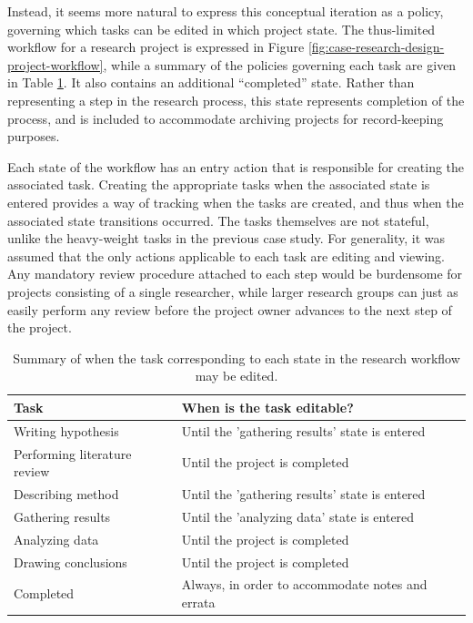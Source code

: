 \documentclass[document.tex]{subfiles}
\begin{document}
Instead, it seems more natural to express this conceptual iteration as a policy, governing which tasks can be edited in which project state. The thus-limited workflow for a research project is expressed in Figure \ref{fig:case-research-design-project-workflow}, while a summary of the policies governing each task are given in Table \ref{tbl:case-research-edit-policies}. It also contains an additional ``completed'' state. Rather than representing a step in the research process, this state represents completion of the process, and is included to accommodate archiving projects for record-keeping purposes.

Each state of the workflow has an entry action that is responsible for creating the associated task. Creating the appropriate tasks when the associated state is entered provides a way of tracking when the tasks are created, and thus when the associated state transitions occurred. The tasks themselves are not stateful, unlike the heavy-weight tasks in the previous case study. For generality, it was assumed that the only actions applicable to each task are editing and viewing. Any mandatory review procedure attached to each step would be burdensome for projects consisting of a single researcher, while larger research groups can just as easily perform any review before the project owner advances to the next step of the project.

\begin{table}
  \centering
  \caption{Summary of when the task corresponding to each state in the research workflow may be edited.}
  \label{tbl:case-research-edit-policies}
  \tablespacer
  \begin{tabular}{ l l }
    \toprule
    Task & When is the task editable? \\
    \midrule
    Writing hypothesis & Until the 'gathering results' state is entered \\
    Performing literature review & Until the project is completed \\
    Describing method & Until the 'gathering results' state is entered \\
    Gathering results & Until the 'analyzing data' state is entered \\
    Analyzing data & Until the project is completed \\
    Drawing conclusions & Until the project is completed \\
    Completed & Always, in order to accommodate notes and errata \\
    \bottomrule
  \end{tabular}
\end{table}
\end{document}
